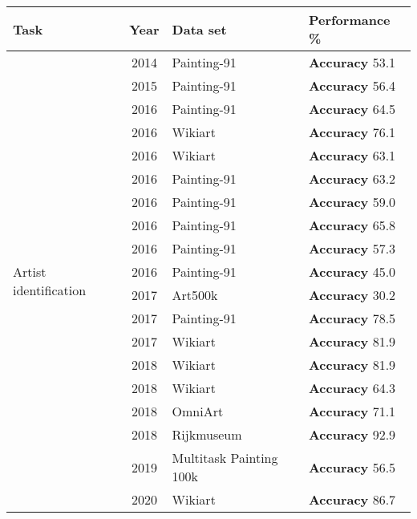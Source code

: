 \documentclass[acmlarge]{acmart}
\begin{document}
\begin{table}[tp]
\centering
\small
\begin{tabular}{|p{3.2cm}|c|p{3.8cm}|p{3.9cm}|}
\hline
\textbf{Task} & \textbf{Year} & \textbf{Data set} & \textbf{Performance \%} \\
\hline
\multirow{19}{*}{Artist identification} & 2014 & Painting-91 & \textbf{Accuracy} 53.1 \cite{painting91} \\ \cline{2-4}
& 2015 & Painting-91 & \textbf{Accuracy} 56.4 \cite{peng2015cross} \\ \cline{2-4}
& 2016 & Painting-91 & \textbf{Accuracy} 64.5 \cite{anwer2016combining} \\ \cline{2-4}
& 2016 & Wikiart & \textbf{Accuracy} 76.1 \cite{tan2016ceci} \\ \cline{2-4}
& 2016 & Wikiart & \textbf{Accuracy} 63.1 \cite{saleh2015large} \\ \cline{2-4}
& 2016 & Painting-91 & \textbf{Accuracy} 63.2 \cite{chu2016deep}\\ \cline{2-4}
& 2016 & Painting-91 & \textbf{Accuracy} 59.0 \cite{puthenputhussery2016color} \\ \cline{2-4}
& 2016 & Painting-91 & \textbf{Accuracy} 65.8 \cite{puthenputhussery2016sparse} \\ \cline{2-4}
& 2016 & Painting-91 & \textbf{Accuracy} 57.3 \cite{peng2016toward} \\ \cline{2-4}
& 2016 & Painting-91 & \textbf{Accuracy} 45.0 \cite{banerji2016painting} \\ \cline{2-4}
& 2017  & Art500k & \textbf{Accuracy} 30.2 \cite{mao2017deepart} \\ \cline{2-4}
& 2017 & Painting-91 & \textbf{Accuracy} 78.5 \cite{bianco2017large} \\ \cline{2-4}
& 2017 & Wikiart & \textbf{Accuracy} 81.9 \cite{huang2017fine} \\ \cline{2-4}
& 2018 & Wikiart & \textbf{Accuracy} 81.9 \cite{cetinic2018fine} \\ \cline{2-4}
& 2018 & Wikiart & \textbf{Accuracy} 64.3 \cite{chu2018image} \\ \cline{2-4}
& 2018 & OmniArt & \textbf{Accuracy} 71.1 \cite{strezoski2018omniart} \\ \cline{2-4}
& 2018 & Rijkmuseum & \textbf{Accuracy} 92.9 \cite{sabatelli2018deep} \\ \cline{2-4}
& 2019 & Multitask Painting 100k & \textbf{Accuracy} 56.5 \cite{Bianco2019MultitaskPC} \\ \cline{2-4}
& 2020 & Wikiart & \textbf{Accuracy} 86.7 \cite{zhong2020fine} \\ \hline

\end{tabular}
\end{table}
\end{document}
